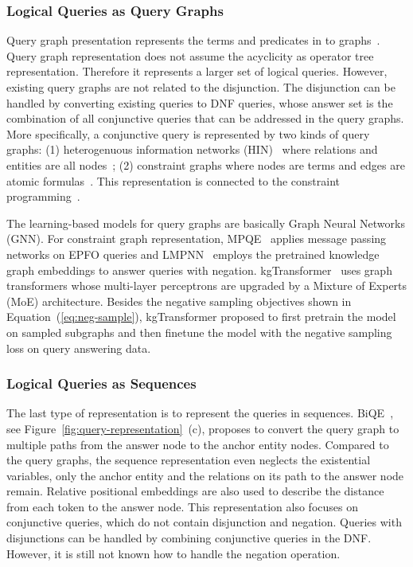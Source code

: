 \documentclass[11pt]{article}
\begin{document}
\subsubsection{Logical Queries as Query Graphs}
Query graph presentation represents the terms and predicates in to graphs~\cite{Daza2020MessagePassing,Liu2022MaskReason,LMPNN}. Query graph representation does not assume the acyclicity as operator tree representation. Therefore it represents a larger set of logical queries. However, existing query graphs are not related to the disjunction. The disjunction can be handled by converting existing queries to DNF queries, whose answer set is the combination of all conjunctive queries that can be addressed in the query graphs. More specifically, a conjunctive query is represented by two kinds of query graphs: (1) heterogenuous information networks (HIN)~\cite{shi2016survey} where relations and entities are all nodes~\cite{Liu2022MaskReason}; (2) constraint graphs where nodes are terms and edges are atomic formulas~\cite{Arakelyan2021ComplexQuery,LMPNN}. This representation is connected to the constraint programming~\cite{rossi2006handbook}.

The learning-based models for query graphs are basically Graph Neural Networks (GNN). For constraint graph representation, MPQE~\cite{Daza2020MessagePassing} applies message passing networks on EPFO queries and LMPNN~\cite{LMPNN} employs the pretrained knowledge graph embeddings to answer queries with negation.
kgTransformer~\cite{Liu2022MaskReason} uses graph transformers whose multi-layer perceptrons are upgraded by a Mixture of Experts (MoE) architecture. Besides the negative sampling objectives shown in Equation~(\ref{eq:neg-sample}), kgTransformer proposed to first pretrain the model on sampled subgraphs and then finetune the model with the negative sampling loss on query answering data.

\subsubsection{Logical Queries as Sequences}
The last type of representation is to represent the queries in sequences. BiQE~\cite{Kotnis2021AnsweringComplex}, see Figure~\ref{fig:query-representation}~(c), proposes to convert the query graph to multiple paths from the answer node to the anchor entity nodes. Compared to the query graphs, the sequence representation even neglects the existential variables, only the anchor entity and the relations on its path to the answer node remain. Relative positional embeddings are also used to describe the distance from each token to the answer node. This representation also focuses on conjunctive queries, which do not contain disjunction and negation. Queries with disjunctions can be handled by combining conjunctive queries in the DNF. However, it is still not known how to handle the negation operation.
\end{document}
